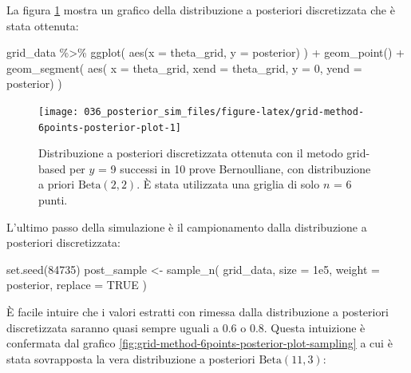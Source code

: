 \documentclass[
  10pt,
  italian,
  a4paper,
  extrafontsizes,onecolumn,openright
  ]{memoir}
\newenvironment{Shaded}{\begin{snugshade}}{\end{snugshade}}
\newcommand{\AttributeTok}[1]{\textcolor[rgb]{0.77,0.63,0.00}{#1}}
\newcommand{\ConstantTok}[1]{\textcolor[rgb]{0.00,0.00,0.00}{#1}}
\newcommand{\DecValTok}[1]{\textcolor[rgb]{0.00,0.00,0.81}{#1}}
\newcommand{\FloatTok}[1]{\textcolor[rgb]{0.00,0.00,0.81}{#1}}
\newcommand{\FunctionTok}[1]{\textcolor[rgb]{0.00,0.00,0.00}{#1}}
\newcommand{\NormalTok}[1]{#1}
\newcommand{\OtherTok}[1]{\textcolor[rgb]{0.56,0.35,0.01}{#1}}
\newcommand{\SpecialCharTok}[1]{\textcolor[rgb]{0.00,0.00,0.00}{#1}}
\begin{document}
\noindent
La figura \ref{fig:grid-method-6points-posterior-plot} mostra un grafico della distribuzione a posteriori discretizzata che è stata ottenuta:

\begin{Shaded}
\begin{Highlighting}[]
\NormalTok{grid\_data }\SpecialCharTok{\%\textgreater{}\%} 
  \FunctionTok{ggplot}\NormalTok{(}
    \FunctionTok{aes}\NormalTok{(}\AttributeTok{x =}\NormalTok{ theta\_grid, }\AttributeTok{y =}\NormalTok{ posterior)}
\NormalTok{  ) }\SpecialCharTok{+}
  \FunctionTok{geom\_point}\NormalTok{() }\SpecialCharTok{+}
  \FunctionTok{geom\_segment}\NormalTok{(}
    \FunctionTok{aes}\NormalTok{(}
      \AttributeTok{x =}\NormalTok{ theta\_grid, }
      \AttributeTok{xend =}\NormalTok{ theta\_grid, }
      \AttributeTok{y =} \DecValTok{0}\NormalTok{, }
      \AttributeTok{yend =}\NormalTok{ posterior)}
\NormalTok{  )}
\end{Highlighting}
\end{Shaded}

\begin{figure}[h]

{\centering \texttt{[image: 036\_posterior\_sim\_files/figure-latex/grid-method-6points-posterior-plot-1]} 

}

\caption{Distribuzione a posteriori discretizzata ottenuta con il metodo grid-based per $y$ = 9 successi in 10 prove Bernoulliane, con distribuzione a priori $\mbox{Beta}(2, 2)$. È stata utilizzata una griglia di solo $n$ = 6 punti.}\label{fig:grid-method-6points-posterior-plot}
\end{figure}

\noindent
L'ultimo passo della simulazione è il campionamento dalla distribuzione a posteriori discretizzata:

\begin{Shaded}
\begin{Highlighting}[]
\FunctionTok{set.seed}\NormalTok{(}\DecValTok{84735}\NormalTok{)}
\NormalTok{post\_sample }\OtherTok{\textless{}{-}} \FunctionTok{sample\_n}\NormalTok{(}
\NormalTok{  grid\_data,}
  \AttributeTok{size =} \FloatTok{1e5}\NormalTok{,}
  \AttributeTok{weight =}\NormalTok{ posterior,}
  \AttributeTok{replace =} \ConstantTok{TRUE}
\NormalTok{)}
\end{Highlighting}
\end{Shaded}

\noindent
È facile intuire che i valori estratti con rimessa dalla distribuzione a posteriori discretizzata saranno quasi sempre uguali a 0.6 o 0.8. Questa intuizione è confermata dal grafico \ref{fig:grid-method-6points-posterior-plot-sampling} a cui è stata sovrapposta la vera distribuzione a posteriori \(\mbox{Beta}(11, 3)\):
\end{document}
